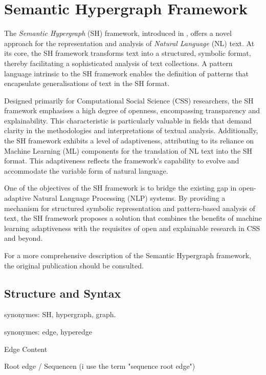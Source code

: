 \documentclass[11pt]{scrreprt}
\let\citef\cite  %
\let\cite\parencite  %
\begin{document}
\section{Semantic Hypergraph Framework}

The \textit{Semantic Hypergraph} (SH) framework, introduced in \citef{menezesSemanticHypergraphs2021}, offers a novel approach for the representation and analysis of \textit{Natural Language} (NL) text. At its core, the SH framework transforms text into a structured, symbolic format, thereby facilitating a sophisticated analysis of text collections. A pattern language intrinsic to the SH framework enables the definition of patterns that encapsulate generalisations of text in the SH format.

Designed primarily for Computational Social Science (CSS) researchers, the SH framework emphasises a high degree of openness, encompassing transparency and explainability. This characteristic is particularly valuable in fields that demand clarity in the methodologies and interpretations of textual analysis. Additionally, the SH framework exhibits a level of adaptiveness, attributing to its reliance on Machine Learning (ML) components for the translation of NL text into the SH format. This adaptiveness reflects the framework's capability to evolve and accommodate the variable form of natural language.

One of the objectives of the SH framework is to bridge the existing gap in open-adaptive Natural Language Processing (NLP) systems. By providing a mechanism for structured symbolic representation and pattern-based analysis of text, the SH framework proposes a solution that combines the benefits of machine learning adaptiveness with the requisites of open and explainable research in CSS and beyond.

For a more comprehensive description of the Semantic Hypergraph framework, the original publication \cite{menezesSemanticHypergraphs2021} should be consulted.


\subsection{Structure and Syntax}

synonymes: SH, hypergraph, graph.

synonymes: edge, hyperedge

Edge Content

Root edge / Sequencen (i use the term "sequence root edge")
\end{document}
